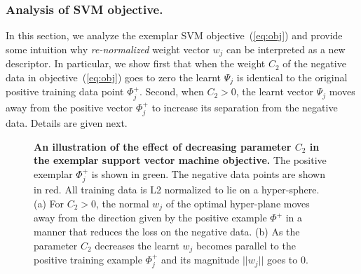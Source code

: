       \subsubsection{Analysis of SVM objective.}
      \textcolor{petr}{
      In this section, we analyze the exemplar SVM objective~(\ref{eq:obj}) and provide some intuition why {\em re-normalized} weight vector $w_j$ can be interpreted as a new descriptor.  In particular, we show first that when the weight $C_2$ of the negative data in objective~(\ref{eq:obj}) goes to zero the learnt $\Psi_j$ is identical to the original positive training data point $\Phi_j^+$. Second, when $C_2>0$, the learnt vector $\Psi_j$ moves away from the positive vector  $\Phi_j^+$ to increase its separation from the negative data.
      Details are given next.
      }
      \begin{figure}[t]
         \begin{center}
            \caption{
               {\bf An illustration of the effect of decreasing parameter $C_2$ in the exemplar support vector machine objective.} 
               The positive exemplar $\Phi_j^+$ is shown in green. The negative data points are shown in red. All training data is L2 normalized to lie on a hyper-sphere. (a) For $C_2>0$, the normal $w_j$ of the optimal hyper-plane moves away from the direction given by the positive example $\Phi^+$ in a manner that reduces the loss on the negative data.  (b) As the parameter $C_2$ decreases the learnt $w_j$ becomes parallel to the positive training example $\Phi_j^+$ and its magnitude $||w_j||$ goes to 0.
            }
            \label{fig:C2effect}
         \end{center}
      \end{figure}
